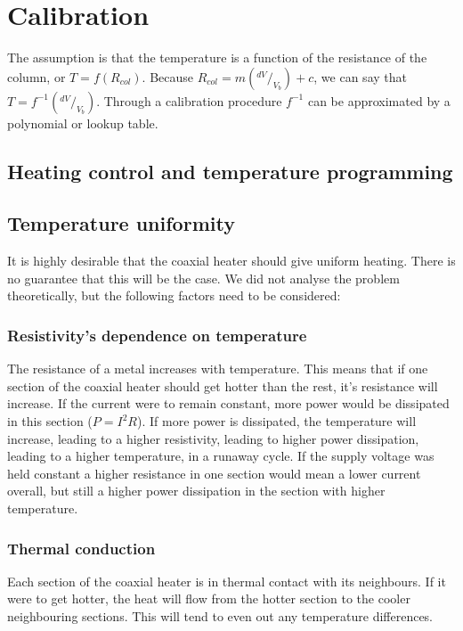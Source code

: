 \section{Calibration}

The assumption is that the temperature is a function of the resistance of the
column, or $T = f(R_{col})$. Because $R_{col}=m(^{dV}/_{V_b}) + c$, we can say
that $T = f^{-1}(^{dV}/_{V_b})$. Through a calibration procedure $f^{-1}$ can be
approximated by a polynomial or lookup table.

\subsection{Heating control and temperature programming}

\subsection{Temperature uniformity}
\label{sec:Uniformity}

It is highly desirable that the coaxial heater should give uniform heating.
There is no guarantee that this will be the case. We did not analyse the problem
theoretically, but the following factors need to be considered:

\subsubsection{Resistivity's dependence on temperature}

The  resistance of a metal increases with temperature. This means that if one
section of the coaxial heater should get hotter than the rest, it's resistance
will increase. If the current were to remain constant, more power would be
dissipated in this section (\(P=I^2R\)). If more power is dissipated, the
temperature will increase, leading to a higher resistivity, leading to higher
power dissipation, leading to a higher temperature, in a runaway cycle. If the
supply voltage was held constant a higher resistance in one section would mean a
lower current overall, but still a higher power dissipation in the section with higher temperature. 

\subsubsection{Thermal conduction}

Each section of the coaxial heater is in thermal contact with its neighbours. If
it were to get hotter, the heat will flow from the hotter section to the cooler
neighbouring sections. This will tend to even out any temperature differences.

